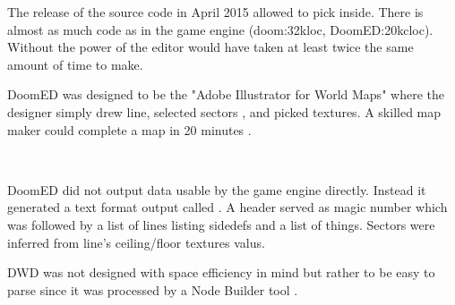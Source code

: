 The release of the source code in April 2015 allowed to pick inside. There is almost as much code as in the game engine (doom:32kloc, DoomED:20kcloc). Without the power of \NeXT the editor would have taken at least twice the same amount of time to make.



\par
DoomED was designed to be the "Adobe Illustrator for World Maps" where the designer simply drew line, selected sectors , and picked textures. A skilled map maker could complete a map in 20 minutes .\\
\par

\\
\par
{}


\vspace{-4mm}
DoomED did not output data usable by the game engine directly. Instead it generated a text format output called . A header served as magic number which was followed by a list of lines listing sidedefs and a list of things. Sectors were inferred from line's ceiling/floor textures valus.\\
\par
{}
\par
DWD was not designed with space efficiency in mind but rather to be easy to parse since it was processed by a Node Builder tool .\\
\par
{}
\par

\pagebreak





